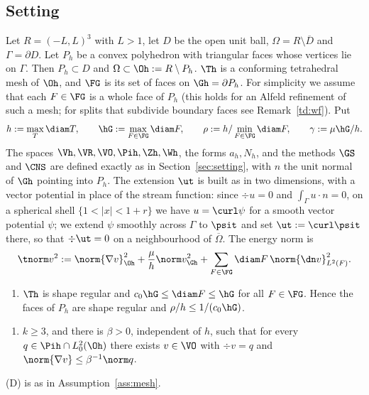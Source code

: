 \subsection{Setting}\label{td:setting}
Let $R=(-L,L)^3$ with $L>1$, let $D$ be the open unit ball, $\Omega=R\setminus\overline D$ and $\Gamma=\partial D$. Let $P_h$ be a convex polyhedron with triangular faces whose vertices lie on $\Gamma$. Then $P_h\subset D$ and $\Omega\subset\Oh:=R\setminus P_h$. $\Th$ is a conforming tetrahedral mesh of $\Oh$, and $\FG$ is its set of faces on $\Gh=\partial P_h$. For simplicity we assume that each $F\in\FG$ is a whole face of $P_h$ (this holds for an Alfeld refinement of such a mesh; for splits that subdivide boundary faces see Remark~\ref{td:wf}). Put
\[
h:=\max_T\diam T,\qquad \hG:=\max_{F\in\FG}\diam F,\qquad \rho:=h/\min_{F\in\FG}\diam F,\qquad \gamma:=\mu\hG/h .
\]
The spaces $\Vh,\VR,\VO,\Pih,\Zh,\Wh$, the forms $a_h,N_h$, and the methods $\GS$ and $\CNS$ are defined exactly as in Section~\ref{sec:setting}, with $n$ the unit normal of $\Gh$ pointing into $P_h$. The extension $\ut$ is built as in two dimensions, with a vector potential in place of the stream function: since $\div u=0$ and $\int_\Gamma u\cdot n=0$, on a spherical shell $\{1<|x|<1+r\}$ we have $u=\curl\psi$ for a smooth vector potential $\psi$; we extend $\psi$ smoothly across $\Gamma$ to $\psit$ and set $\ut:=\curl\psit$ there, so that $\div\ut=0$ on a neighbourhood of $\overline\Omega$. The energy norm is
\[
\tnorm v^2:=\norm{\nabla v}^2_{\Oh}+\frac\mu h\norm v^2_{\Gh}+\sum_{F\in\FG}\diam F\,\norm{\dn v}^2_{L^2(F)} .
\]

\begin{assumption}\label{td:ass}\leavevmode
\begin{enumerate}[label=(M0$^3$)]
\item $\Th$ is shape regular and $c_0\hG\le\diam F\le\hG$ for all $F\in\FG$. Hence the faces of $P_h$ are shape regular and $\rho/h\le1/(c_0\hG)$.
\end{enumerate}
\begin{enumerate}[label=(IS3)]
\item $k\ge3$, and there is $\beta>0$, independent of $h$, such that for every $q\in\Pih\cap L^2_0(\Oh)$ there exists $v\in\VO$ with $\div v=q$ and $\norm{\nabla v}\le\beta^{-1}\norm q$.
\end{enumerate}
(D) is as in Assumption~\ref{ass:mesh}.
\end{assumption}

